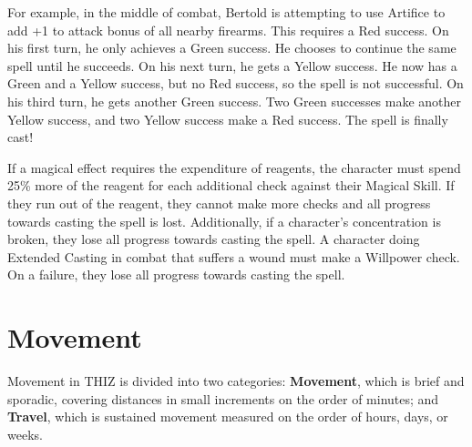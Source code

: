 \documentclass[oneside]{book}
\begin{document}
\begin{multicols}{2}
For example, in the middle of combat, Bertold is attempting to use Artifice to add +1 to attack bonus of all nearby firearms. This requires a Red success. On his first turn, he only achieves a Green success. He chooses to continue the same spell until he succeeds. On his next turn, he gets a Yellow success. He now has a Green and a Yellow success, but no Red success, so the spell is not successful. On his third turn, he gets another Green success. Two Green successes make another Yellow success, and two Yellow success make a Red success. The spell is finally cast!

If a magical effect requires the expenditure of reagents, the character must spend 25\% more of the reagent for each additional check against their Magical Skill. If they run out of the reagent, they cannot make more checks and all progress towards casting the spell is lost. Additionally, if a character's concentration is broken, they lose all progress towards casting the spell. A character doing Extended Casting in combat that suffers a wound must make a Willpower check. On a failure, they lose all progress towards casting the spell. 

\end{multicols}

\chapter{Movement}
Movement in THIZ is divided into two categories: \textbf{Movement}, which is brief and sporadic, covering distances in small increments on the order of minutes; and \textbf{Travel}, which is sustained movement measured on the order of hours, days, or weeks. 
\end{document}
